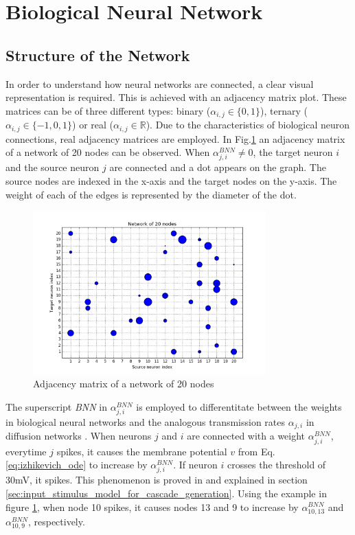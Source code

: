 \section{Biological Neural Network}

\subsection{Structure of the Network}

In order to understand how neural networks are connected, a clear visual representation is required. This is achieved with an adjacency matrix plot. These matrices can be of three different types: binary ($\alpha_{i,j}\in\{0,1\}$), ternary ($\alpha_{i,j}\in\{-1,0,1\}$) or real ($\alpha_{i,j}\in \mathbb{R}$). Due to the characteristics of biological neuron connections, real adjacency matrices are employed. In Fig.\ref{fig:graph_20_nodes} an adjacency matrix of a network of 20 nodes can be observed. When $\alpha_{j,i}^{BNN}\neq 0$, the target neuron $i$ and the source neuron $j$ are connected and a dot appears on the graph. The source nodes are indexed in the x-axis and the target nodes on the y-axis. The weight of each of the edges is represented by the diameter of the dot. \\

\begin{figure}
  \centering
  \includegraphics[width=0.8\textwidth]{graph_20_nodes.png}
  \caption{Adjacency matrix of a network of 20 nodes}
	\label{fig:graph_20_nodes}
\end{figure}

The superscript \textit{BNN} in $\alpha_{j,i}^{BNN}$ is employed to differentitate between the weights in biological neural networks and the analogous transmission rates $\alpha_{j,i}$ in diffusion networks \cite{pranav_report}. When neurons $j$ and $i$ are connected with a weight $\alpha_{j,i}^{BNN}$, everytime $j$ spikes, it causes the membrane potential $v$ from Eq.\ref{eq:izhikevich_ode} to increase by $\alpha_{j,i}^{BNN}$. If neuron $i$ crosses the threshold of 30mV, it spikes. This phenomenon is proved in \cite{alexandru2018estimating} and explained in section \ref{sec:input_stimulus_model_for_cascade_generation}. Using the example in figure \ref{fig:graph_20_nodes}, when node 10 spikes, it causes nodes 13 and 9 to increase by $\alpha_{10,13}^{BNN}$ and $\alpha_{10,9}^{BNN}$, respectively. 


